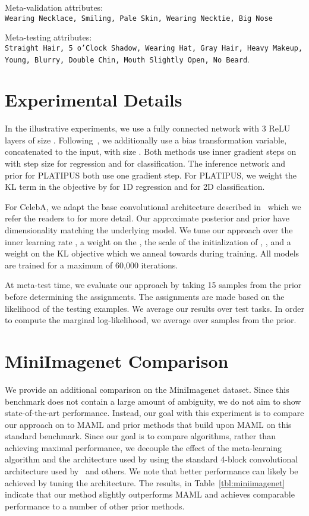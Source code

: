 \documentclass{article}
\begin{document}
Meta-validation attributes:\\
{\small \texttt{Wearing Necklace, Smiling, Pale Skin, Wearing Necktie, Big Nose}}

Meta-testing attributes:\\
{ \small \texttt{Straight Hair, 5 o'Clock Shadow, Wearing Hat, Gray Hair, Heavy Makeup, Young, Blurry, Double Chin, Mouth Slightly Open, No Beard}}.

\section{Experimental Details}
In the illustrative experiments, we use a fully connected network with 3 ReLU layers of size . Following~\citet{finn2017one}, we additionally use a bias transformation variable, concatenated to the input, with size . Both methods use  inner gradient steps on  with step size  for regression and  for classification. The inference network and prior for PLATIPUS both use one gradient step. For PLATIPUS, we weight the KL term in the objective by  for 1D regression and  for 2D classification.

For CelebA, we adapt the base convolutional architecture described in~\citet{finn2017model} which we refer the readers to for more detail. Our approximate posterior and prior have dimensionality matching the underlying model.
We tune our approach over the inner learning rate , a weight on the , the scale of the initialization of , , and a weight on the KL objective  which we anneal towards during training. All models are trained for a maximum of 60,000 iterations.

At meta-test time, we evaluate our approach by taking 15 samples from the prior before determining the assignments. The assignments are made based on the likelihood of the testing examples. We average our results over  test tasks. In order to compute the marginal log-likelihood, we average over  samples from the prior. 

\section{MiniImagenet Comparison}

We provide an additional comparison on the MiniImagenet dataset.
Since this benchmark does not contain a large amount of ambiguity, we do not aim to show state-of-the-art performance. Instead, our goal with this experiment is to compare our approach on to MAML and prior methods that build upon MAML on this standard benchmark. Since our goal is to compare algorithms, rather than achieving maximal performance, we decouple the effect of the meta-learning algorithm and the architecture used by using the standard 4-block convolutional architecture used by~\citet{vinyals2016matching,ravi2017optimization,finn2017model} and others. We note that better performance can likely be achieved by tuning the architecture. The results, in Table~\ref{tbl:miniimagenet} indicate that our method slightly outperforms MAML and achieves comparable performance to a number of other prior methods.
\end{document}
